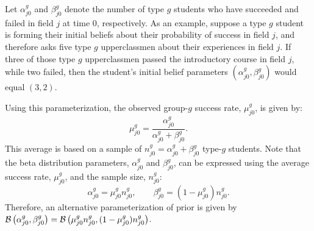 
Let $\alpha_{j0}^g$ and $\beta_{j0}^g$ denote the number of type $g$ students who have succeeded and failed in field $j$ at time 0, respectively.
As an example, suppose a type $g$ student is forming their initial beliefs about their probability of success in field $j$, and therefore asks five type $g$ upperclassmen about their experiences in field $j$.
If three of those type $g$ upperclassmen passed the introductory course in field $j$, while two failed, then the student's initial belief parameters $(\alpha_{j0}^g, \beta_{j0}^g)$ would equal $(3, 2)$.


Using this parameterization, the observed group-$g$ success rate, $\mu_{j0}^g$, is given by:
\begin{equation*}
\mu_{j0}^g = 
  \frac{\alpha_{j0}^g}{\alpha_{j0}^g + \beta_{j0}^g}.
\end{equation*}
This average is based on a sample of $n_{j0}^g = \alpha_{j0}^g + \beta_{j0}^g$ type-$g$ students.
Note that the beta distribution parameters, $\alpha_{j0}^g$ and $\beta_{j0}^g$, can be expressed using the average success rate, $\mu_{j0}^g$, and the sample size, $n_{j0}^g$:
\begin{equation*}
     \alpha_{j0}^g = \mu_{j0}^g n_{j0}^g,
     \quad \quad \beta_{j0}^g = (1 - \mu_{j0}^g) n_{j0}^g.
 \end{equation*}
 Therefore, an alternative parameterization of prior is given by $\mathcal{B} \left( \alpha_{j0}^g, \beta_{j0}^g \right) = \mathcal{B} \left( \mu_{j0}^g n_{j0}^g, (1 - \mu_{j0}^g) n_{j0}^g \right)$.
 
